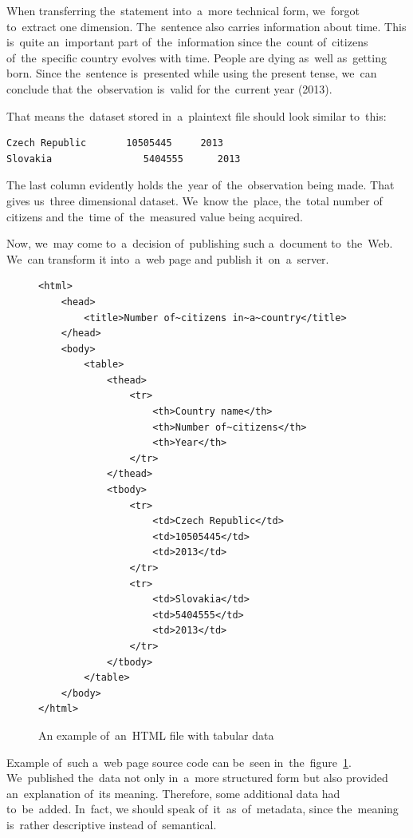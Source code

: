 When transferring the~statement into~a~more technical form, we~forgot to~extract one
dimension. The~sentence also carries information about time. This is~quite an~important
part of~the~information since the~count of~citizens of~the~specific country evolves with time.
People are dying as~well as~getting born. Since the~sentence is~presented while using the
present tense, we~can conclude that the~observation is~valid for the~current year (2013).

That means the~dataset stored in~a~plaintext file should look similar to~this:

\begin{verbatim}
Czech Republic       10505445     2013
Slovakia	            5404555      2013
\end{verbatim}

The last column evidently holds the~year of~the~observation being made.
That gives us~three dimensional dataset. We~know the~place, the~total number of
citizens and the~time of~the~measured value being acquired.

Now, we~may come to~a~decision of~publishing such a~document to~the~Web. We~can transform
it into~a~web page and publish it~on~a~server.
\begin{figure}
\small\begin{verbatim}
<html>
    <head>
        <title>Number of~citizens in~a~country</title>
    </head>
    <body>
        <table>
            <thead>
                <tr>
                    <th>Country name</th>
                    <th>Number of~citizens</th>
                    <th>Year</th>
                </tr>
            </thead>
            <tbody>
                <tr>
                    <td>Czech Republic</td>
                    <td>10505445</td>
                    <td>2013</td>
                </tr>
                <tr>
                    <td>Slovakia</td>
                    <td>5404555</td>
                    <td>2013</td>
                </tr>
            </tbody>
        </table>
    </body>
</html>
\end{verbatim}\normalsize
\caption{An example of~an~HTML file with tabular data}
\label{fig:rdf-html-01}
\end{figure}

Example of~such a~web page source code can be~seen in~the~figure~\ref{fig:rdf-html-01}. We~published the~data not only in~a~more structured form but also
provided an~explanation of~its meaning. Therefore, some additional data had to~be~added. In~fact, we
should speak of~it~as~of~metadata, since the~meaning is~rather descriptive instead of~semantical.

